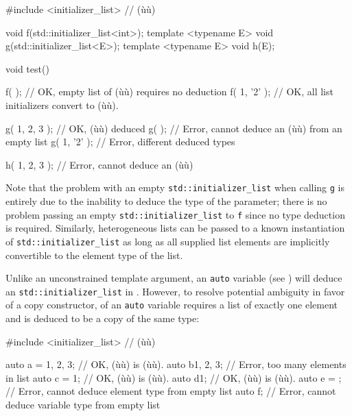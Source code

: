 \begin{emcppslisting}
#include <initializer_list>  // (ù{}ù)

void f(std::initializer_list<int>);
template <typename E> void g(std::initializer_list<E>);
template <typename E> void h(E);

void test()
{
    f({ });                 // OK, empty list of (ù{}ù) requires no deduction
    f({ 1, '2' });          // OK, all list initializers convert to (ù{}ù).

    g({ 1, 2, 3 });         // OK, (ù{}ù) deduced
    g({ });                 // Error, cannot deduce an (ù{}ù) from an empty list
    g({ 1, '2' });          // Error, different deduced types

    h({ 1, 2, 3 });         // Error, cannot deduce an (ù{}ù)
}
\end{emcppslisting}
    

\noindent Note that the problem with an empty \lstinline!std::initializer_list! when
calling \lstinline!g! is entirely due to the inability to deduce the type
of the parameter; there is no problem passing an empty
\lstinline!std::initializer_list! to \lstinline!f! since no type deduction is
required. Similarly, heterogeneous lists can be passed to a known
instantiation of \lstinline!std::initializer_list! as long as all supplied
list elements are implicitly convertible to the element type of the
list.

Unlike an unconstrained template argument, an \lstinline!auto! variable
(see ) will deduce an
\lstinline!std::initializer_list! in . However, to resolve potential ambiguity in favor of a
copy constructor,  of an
\lstinline!auto! variable requires a list of exactly one element and is
deduced to be a copy of the same type:

\begin{emcppslisting}
#include <initializer_list>  // (ù{}ù)

auto a = {1, 2, 3};  // OK, (ù{}ù) is (ù{}ù).
auto b{1, 2, 3};     // Error, too many elements in list
auto c = {1};        // OK, (ù{}ù) is (ù{}ù).
auto d{1};           // OK, (ù{}ù) is (ù{}ù).
auto e = {};         // Error, cannot deduce element type from empty list
auto f{};            // Error, cannot deduce variable type from empty list
\end{emcppslisting}
    

